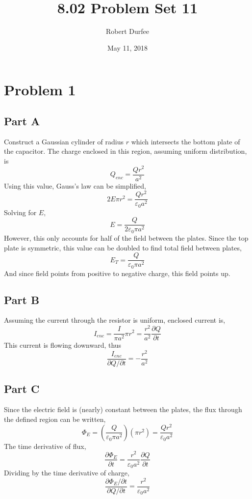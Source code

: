 \documentclass{article}
\title{8.02 Problem Set 11}
\author{Robert Durfee}
\date{May 11, 2018}
\begin{document}
\maketitle

\section*{Problem 1}

\subsection*{Part A}

Construct a Gaussian cylinder of radius $r$ which intersects the bottom plate of
the capacitor. The charge enclosed in this region, assuming uniform
distribution, is
$$ Q_{enc} = \frac{Q r^2}{a^2} $$
Using this value, Gauss's law can be simplified,
$$ 2 E \pi r^2 = \frac{Q r^2}{\varepsilon_0 a^2} $$
Solving for $E$,
$$ E = \frac{Q}{2 \varepsilon_0 \pi a^2} $$
However, this only accounts for half of the field between the plates. Since the
top plate is symmetric, this value can be doubled to find total field between
plates,
$$ E_{T} = \frac{Q}{\varepsilon_0 \pi a^2} $$
And since field points from positive to negative charge, this field points up.

\subsection*{Part B}

Assuming the current through the resistor is uniform, enclosed current is,
$$ I_{enc} = \frac{I}{\pi a^2} \pi r^2 = \frac{r^2}{a^2} \frac{\partial
Q}{\partial t} $$
This current is flowing downward, thus
$$ \frac{I_{enc}}{\partial Q / \partial t} = - \frac{r^2}{a^2} $$

\subsection*{Part C}

Since the electric field is (nearly) constant between the plates, the flux
through the defined region can be written,
$$ \Phi_E = \left( \frac{Q}{\varepsilon_0 \pi a^2} \right) \left( \pi r^2
\right) = \frac{Q r^2}{\varepsilon_0 a^2} $$
The time derivative of flux,
$$ \frac{\partial \Phi_E}{\partial t} = \frac{r^2}{\varepsilon_0 a^2}
\frac{\partial Q}{\partial t} $$
Dividing by the time derivative of charge,
$$ \frac{\partial \Phi_E / \partial t}{\partial Q / \partial t} =
\frac{r^2}{\varepsilon_0 a^2} $$
\end{document}
